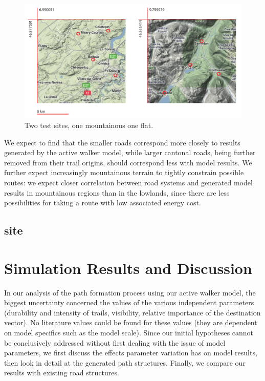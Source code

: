 \documentclass[a4paper, DIV11, abstracton]{scrartcl}
\begin{document}
\begin{figure}[tbp]
	\includegraphics[width=\linewidth]{../figures/site}
	\caption{Two test sites, one mountainous one flat.}
	\label{fig:site}
\end{figure}

We expect to find that the smaller roads correspond more closely to results generated by the active walker model, while larger cantonal roads, being further removed from their trail origins, should correspond less with model results. We further expect increasingly mountainous terrain to tightly constrain possible routes: we expect closer correlation between road systems and generated model results in mountainous regions than in the lowlands, since there are less possibilities for taking a route with low associated energy cost.


\subsection{site}







\section{Simulation Results and Discussion}
In our analysis of the path formation process using our active walker model, the biggest uncertainty concerned the values of the various independent parameters (durability and intensity of trails, visibility, relative importance of the destination vector). No literature values could be found for these values (they are dependent on model specifics such as the model scale). Since our initial hypotheses cannot be conclusively addressed without first dealing with the issue of model parameters, we first discuss the effects parameter variation has on model results, then look in detail at the generated path structures. Finally, we compare our results with existing road structures.
\end{document}
